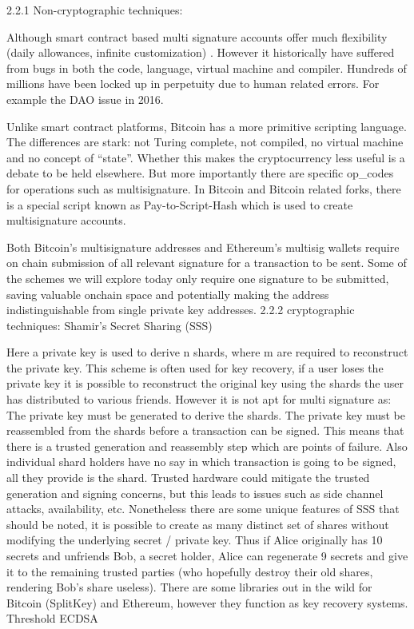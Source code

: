 2.2.1 Non-cryptographic techniques:

Although smart contract based multi signature accounts offer much flexibility (daily allowances, infinite customization) . However it historically have suffered from bugs in both the code, language, virtual machine and compiler. Hundreds of millions have been locked up in perpetuity due to human related errors. For example the DAO issue in 2016. 

Unlike smart contract platforms, Bitcoin has a more primitive scripting language. The differences are stark: not Turing complete, not compiled, no virtual machine and no concept of “state”. Whether this makes the cryptocurrency less useful is a debate to be held elsewhere. But more importantly there are specific op_codes for operations such as multisignature. In Bitcoin and Bitcoin related forks, there is a special script known as Pay-to-Script-Hash which is used to create multisignature accounts. 

Both Bitcoin’s multisignature addresses and Ethereum’s multisig wallets require on chain submission of all relevant signature for a transaction to be sent. Some of the schemes we will explore today only require one signature to be submitted, saving valuable onchain space and potentially making the address indistinguishable from single private key addresses.
2.2.2 cryptographic techniques:
Shamir’s Secret Sharing (SSS)


Here a private key is used to derive n shards, where m are required to reconstruct the private key. This scheme is often used for key recovery, if a user loses the private key it is possible to reconstruct the original key using the shards the user has distributed to various friends. However it is not apt for multi signature as:
The private key must be generated to derive the shards.
The private key must be reassembled from the shards before a transaction can be signed.
This means that there is a trusted generation and reassembly step which are points of failure. Also individual shard holders have no say in which transaction is going to be signed, all they provide is the shard. Trusted hardware could mitigate the trusted generation and signing concerns, but this leads to issues such as side channel attacks, availability, etc.
Nonetheless there are some unique features of SSS that should be noted, it is possible to create as many distinct set of shares without modifying the underlying secret / private key. Thus if Alice originally has 10 secrets and unfriends Bob, a secret holder, Alice can regenerate 9 secrets and give it to the remaining trusted parties (who hopefully destroy their old shares, rendering Bob’s share useless).
There are some libraries out in the wild for Bitcoin (SplitKey) and Ethereum, however they function as key recovery systems.
Threshold ECDSA

